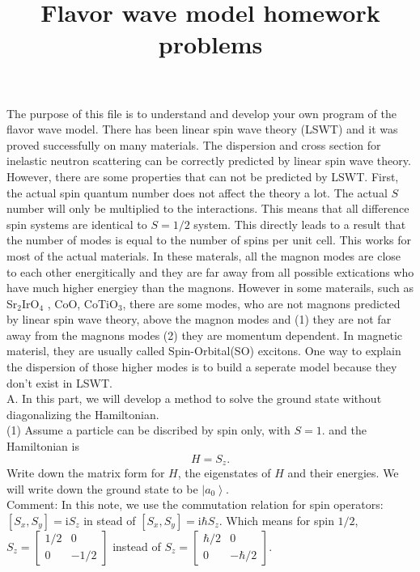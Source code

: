 \documentclass[letter]{article}
\title{{\myfont Flavor wave model homework problems}}
\newcommand{\ii}{\mathrm{i}}
\begin{document}
\maketitle
The purpose of this file is to understand and develop your own program of the flavor wave model. There has been linear spin wave theory (LSWT) and it was proved successfully on many materials. The dispersion and cross section for inelastic neutron scattering can be correctly predicted by linear spin wave theory. However, there are some properties that can not be predicted by LSWT. First, the actual spin quantum number does not affect the theory a lot. The actual $S$ number will only be multiplied to the interactions. This means that all difference spin systems are identical to $S=1/2$ system. This directly leads to a result that the number of modes is equal to the number of spins per unit cell. This works for most of the actual materials. In these materals, all the magnon modes are close to each other energitically and they are far away from all possible extications who have much higher energiey than the magnons. However in some materails, such as Sr$_2$IrO$_4$ \cite{Kim2014}, CoO, CoTiO$_3$, there are some modes, who are not magnons predicted by linear spin wave theory, above the magnon modes and (1) they are not far away from the magnons modes (2) they are momentum dependent. In magnetic materisl, they are usually called Spin-Orbital(SO) excitons. One way to explain the dispersion of those higher modes is to build a seperate model because they don't exist in LSWT. \\
{\large{A}}. In this part, we will develop a method to solve the ground state without diagonalizing the Hamiltonian. \\
\indent (1)  Assume a particle can be discribed by spin only, with $S=1$. and the Hamiltonian is 
$$ H= S_z.
$$
Write down the matrix form for $H$, the eigenstates of $H$ and their energies. We will write down the ground state to be $\left|a_0\right>$.\\
\indent Comment: In this note, we use the commutation relation for spin operators: $[S_x,S_y]=\ii S_z$ in stead of $[S_x,S_y]=\ii \hbar S_z$. Which means for spin $1/2$, $S_z=\begin{bmatrix}
    1/2 & 0 \\
    0 &  -1/2
    \end{bmatrix}$ instead of $ S_z=\begin{bmatrix}
        \hbar/2 & 0 \\
        0 &  -\hbar/2
        \end{bmatrix}$. \\
\end{document}
